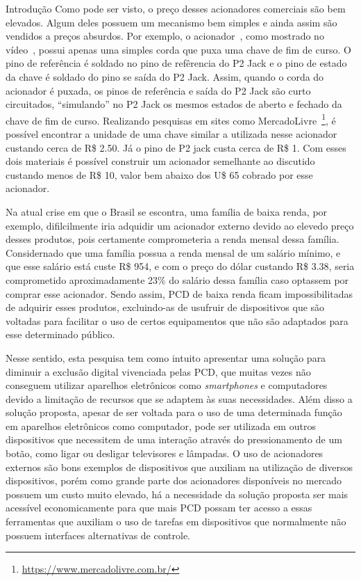 \begin{chapter}{Introdução}
Como pode ser visto, o preço desses acionadores comerciais são bem elevados.
Algum deles possuem um mecanismo bem simples e ainda assim são vendidos a preços
absurdos. Por exemplo, o acionador~\cite{StringSwitch}, como mostrado no
vídeo~\cite{videoStringSwitch}, possui apenas uma simples corda que puxa uma
chave de fim de curso. O pino de referência é soldado no pino de refêrencia do
P2 Jack e o pino de estado da chave é soldado do pino se saída do P2 Jack.
Assim, quando o corda do acionador é puxada, os pinos de referência e saída do
P2 Jack são curto circuitados, ``simulando'' no P2 Jack os mesmos estados de
aberto e fechado da chave de fim de curso. Realizando pesquisas em sites como
MercadoLivre~\footnote{\url{https://www.mercadolivre.com.br/}}, é possível
encontrar a unidade de uma chave similar a utilizada nesse acionador custando 
cerca de R\$ 2.50. Já o pino de P2 jack custa cerca de R\$ 1. Com esses dois
materiais é possível construir um acionador semelhante ao discutido custando
menos de R\$ 10, valor bem abaixo dos U\$ 65 cobrado por esse acionador.

Na atual crise em que o Brasil se escontra, uma família de baixa renda, por
exemplo, difilcilmente iria adquidir um acionador externo devido ao elevedo
preço desses produtos, pois certamente comprometeria a renda mensal dessa
família.  Considernado que uma família possua a renda mensal de um salário
mínimo, e que esse salário está custe R\$ 954, e com o preço do dólar custando
R\$ 3.38, seria comprometido aproximadamente 23\% do salário dessa família caso
optassem por comprar esse acionador. Sendo assim, PCD de baixa renda ficam
impossibilitadas de adquirir esses produtos, excluindo-as de usufruir de
dispositivos que são voltadas para facilitar o uso de certos equipamentos que
não são adaptados para esse determinado público.

Nesse sentido, esta pesquisa tem como intuito apresentar uma solução para
diminuir a exclusão digital vivenciada pelas PCD, que muitas vezes não conseguem
utilizar aparelhos eletrônicos como \textit{smartphones} e computadores devido a
limitação de recursos que se adaptem às suas necessidades. Além disso a solução
proposta, apesar de ser voltada para o uso de uma determinada função em
aparelhos eletrônicos como computador, pode ser utilizada em outros dispositivos
que necessitem de uma interação através do pressionamento de um botão, como
ligar ou desligar televisores e lâmpadas. O uso de acionadores externos são bons
exemplos de dispositivos que auxiliam na utilização de diversos dispositivos,
porém como grande parte dos acionadores disponíveis no mercado possuem um custo
muito elevado, há a necessidade da solução proposta ser mais acessível
economicamente para que mais PCD possam ter acesso a essas ferramentas que
auxiliam o uso de tarefas em dispositivos que normalmente não possuem interfaces
alternativas de controle. 
 

\end{chapter}
